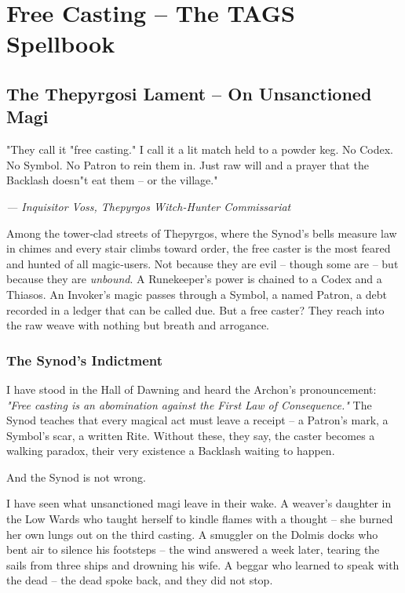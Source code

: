 \documentclass[10pt,a5paper]{book}
\begin{document}
\chapter{Free Casting -- The TAGS Spellbook}

\section{The Thepyrgosi Lament -- On Unsanctioned Magi}

\epigraph{"They call it "free casting." I call it a lit match held to a powder keg. No Codex. No Symbol. No Patron to rein them in. Just raw will and a prayer that the Backlash doesn"t eat them -- or the village."}{\textit{--- Inquisitor Voss, Thepyrgos Witch-Hunter Commissariat}}

Among the tower‑clad streets of Thepyrgos, where the Synod's bells measure law in chimes and every stair climbs toward order, the free caster is the most feared and hunted of all magic‑users. Not because they are evil -- though some are -- but because they are \textit{unbound}. A Runekeeper's power is chained to a Codex and a Thiasos. An Invoker's magic passes through a Symbol, a named Patron, a debt recorded in a ledger that can be called due. But a free caster? They reach into the raw weave with nothing but breath and arrogance.

\subsection{The Synod's Indictment}

I have stood in the Hall of Dawning and heard the Archon's pronouncement: \textit{"Free casting is an abomination against the First Law of Consequence."} The Synod teaches that every magical act must leave a receipt -- a Patron's mark, a Symbol's scar, a written Rite. Without these, they say, the caster becomes a walking paradox, their very existence a Backlash waiting to happen.

And the Synod is not wrong.

I have seen what unsanctioned magi leave in their wake. A weaver's daughter in the Low Wards who taught herself to kindle flames with a thought -- she burned her own lungs out on the third casting. A smuggler on the Dolmis docks who bent air to silence his footsteps -- the wind answered a week later, tearing the sails from three ships and drowning his wife. A beggar who learned to speak with the dead -- the dead spoke back, and they did not stop.
\end{document}
